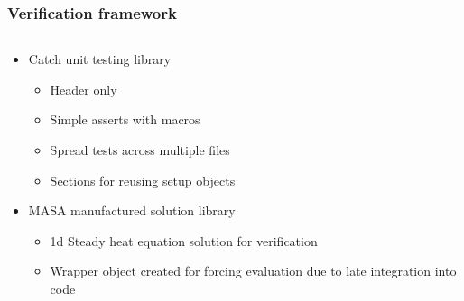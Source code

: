 \documentclass[unknownkeysallowed,12pt,mathserif]{beamer}
\begin{document}
\begin{frame}                                                                                                                                                                          
\frametitle{Verification framework}
\begin{columns}[c]
\begin{column}{6.5cm}
\begin{block}{}
\begin{itemize}
\item {Catch unit testing library}
\begin{itemize}
\item Header only
\item Simple asserts with macros
\item Spread tests across multiple files
\item Sections for reusing setup objects
\end{itemize}
\item MASA manufactured solution library
\begin{itemize}
\item 1d Steady heat equation solution for verification
\item Wrapper object created for forcing evaluation due to late integration into code
\end{itemize}
\end{itemize}
\end{block}
\end{column}


\end{columns}
\end{frame}
\end{document}
